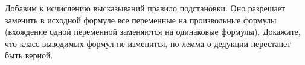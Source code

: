 Добавим к исчислению высказываний правило подстановки. Оно разрешает заменить в исходной формуле все
переменные на произвольные формулы (вхождение одной переменной заменяются на одинаковые
формулы). Докажите, что класс выводимых формул не изменится, но лемма о дедукции перестанет быть верной.
